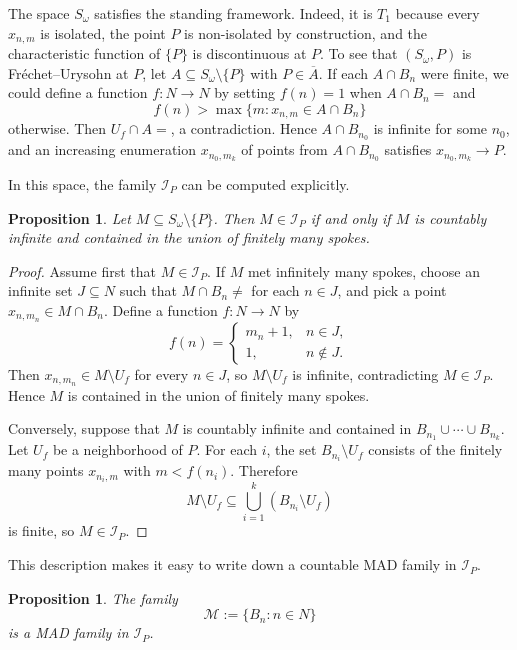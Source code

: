 \documentclass[11pt]{amsart}
\theoremstyle{plain}
\newtheorem{proposition}[theorem]{Proposition}
\theoremstyle{definition}
\theoremstyle{remark}
\newcommand{\N}{\mathbb{N}}
\newcommand{\cl}[1]{\overline{#1}}
\def\N{N}%
\def\emptyset{}%
\begin{document}
The space $S_\omega$ satisfies the standing framework.
Indeed, it is $T_1$ because every $x_{n,m}$ is isolated, the point $P$ is non-isolated by construction, and the characteristic function of $\{P\}$ is discontinuous at $P$.
To see that $(S_\omega,P)$ is Fr\'echet--Urysohn at $P$, let $A\subseteq S_\omega\setminus\{P\}$ with $P\in\cl{A}$.
If each $A\cap B_n$ were finite, we could define a function $f:\N\to\N$ by setting $f(n)=1$ when $A\cap B_n=\emptyset$ and
\[
f(n)>\max\{m:x_{n,m}\in A\cap B_n\}
\]
otherwise.
Then $U_f\cap A=\emptyset$, a contradiction.
Hence $A\cap B_{n_0}$ is infinite for some $n_0$, and an increasing enumeration $x_{n_0,m_k}$ of points from $A\cap B_{n_0}$ satisfies $x_{n_0,m_k}\to P$.

In this space, the family $\mathcal I_P$ can be computed explicitly.

\begin{proposition}\label{prop:sequential_fan_IP}
Let $M\subseteq S_\omega\setminus\{P\}$. Then $M\in\mathcal I_P$ if and only if $M$ is countably infinite and contained in the union of finitely many spokes.
\end{proposition}

\begin{proof}
Assume first that $M\in\mathcal I_P$. If $M$ met infinitely many spokes, choose an infinite set $J\subseteq\N$ such that $M\cap B_n\neq\emptyset$ for each $n\in J$, and pick a point $x_{n,m_n}\in M\cap B_n$. Define a function $f:\N\to\N$ by
\[
f(n)=
\begin{cases}
m_n+1,& n\in J,\\
1,& n\notin J.
\end{cases}
\]
Then $x_{n,m_n}\in M\setminus U_f$ for every $n\in J$, so $M\setminus U_f$ is infinite, contradicting $M\in\mathcal I_P$. Hence $M$ is contained in the union of finitely many spokes.

Conversely, suppose that $M$ is countably infinite and contained in $B_{n_1}\cup\cdots\cup B_{n_k}$. Let $U_f$ be a neighborhood of $P$. For each $i$, the set $B_{n_i}\setminus U_f$ consists of the finitely many points $x_{n_i,m}$ with $m<f(n_i)$. Therefore
\[
M\setminus U_f\subseteq \bigcup_{i=1}^k (B_{n_i}\setminus U_f)
\]
is finite, so $M\in\mathcal I_P$.
\end{proof}

This description makes it easy to write down a countable MAD family in $\mathcal I_P$.

\begin{proposition}\label{prop:sequential_fan_MAD}
The family
\[
\mathcal M:=\{B_n:n\in\N\}
\]
is a MAD family in $\mathcal I_P$.
\end{proposition}
\end{document}
